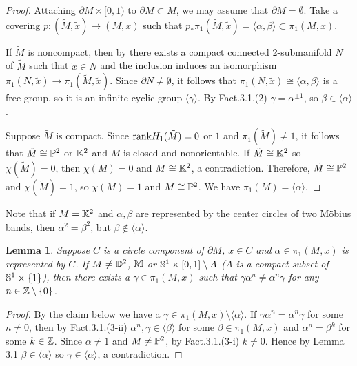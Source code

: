 \documentclass[11pt]{amsart}
\newtheorem{lemma}{Lemma}[section]
\theoremstyle{definition}
\newtheorem*{Proof of Theorem 3.1}{Proof of Theorem 3.1}
\newtheorem*{Proof of Corollary 3.1}{Proof of Corollary 3.1}
\newtheorem*{Proof of Proposition 4.1.(1)}{Proof of Proposition 4.1.(1)}
\newtheorem*{Proof of Proposition 4.1.(2)}{Proof of Proposition 4.1.(2)}
\newtheorem*{Proof of Corollary 1.1}{Proof of Corollary 1.1}
\begin{document}
\begin{proof}
Attaching $\partial M \times [0, 1)$ to $\partial M \subset M$, we may assume that $\partial M = \emptyset$. Take a covering $p : (\tilde{M}, \tilde{x}) \to (M, x)$ such that $p_{\ast}\pi_1(\tilde{M}, \tilde{x}) = \langle \alpha, \beta \rangle \subset \pi_1(M, x)$. 

If $\tilde{M}$ is noncompact, then by \cite[Lemma 2.2]{Ep} there exists a compact connected 2-submanifold $N$ of $\tilde{M}$ such that $\tilde{x} \in N$ and the inclusion induces an isomorphism $\pi_1(N, \tilde{x}) \to \pi_1(\tilde{M}, \tilde{x})$. Since $\partial N \neq \emptyset$, it follows that $\pi_1(N, \tilde{x}) \cong \langle \alpha, \beta \rangle$ is a free group, so it is an infinite cyclic group $\langle \gamma \rangle$. By Fact.3.1.(2) $\gamma = \alpha^{\pm 1}$, so $\beta \in \langle \alpha \rangle$.

Suppose $\tilde{M}$ is compact. Since ${\rm rank}H_1(\tilde{M}) = 0$ or $1$ and $\pi_1(\tilde{M}) \neq 1$, it follows that $\tilde{M} \cong {\Bbb P}^2$ or ${\Bbb K}^2$ and $M$ is closed and nonorientable. If $\tilde{M} \cong {\Bbb K}^2$ so $\chi(\tilde{M}) = 0$, then $\chi(M) = 0$ and $M \cong {\Bbb K}^2$, a contradiction. Therefore, $\tilde{M} \cong {\Bbb P}^2$ and $\chi(\tilde{M}) = 1$, so $\chi(M) = 1$ and $M \cong {\Bbb P}^2$. We have $\pi_1(M) = \langle \alpha \rangle$. 
\end{proof}

Note that if $M = {\Bbb K}^2$ and $\alpha, \beta$ are represented by the center circles of two M\"obius bands, then $\alpha^2 = \beta^2$, but $\beta \not\in \langle \alpha \rangle$.

\begin{lemma}
Suppose $C$ is a circle component of $\partial M$, $x \in C$ and $\alpha \in \pi_1(M, x)$ is represented by $C$. If $M \neq {\Bbb D}^2$, ${\Bbb M}$ or ${\Bbb S}^1 \times [0, 1] \setminus A$ {\rm (}$A$ is a compact subset of ${\Bbb S}^1 \times \{ 1 \}${\rm )}, then there exists a $\gamma \in \pi_1(M, x)$ such that $\gamma \alpha^n \neq \alpha^n \gamma$ for any $n \in {\Bbb Z} \setminus \{ 0 \}$.
\end{lemma}

\begin{proof}
By the claim below we have a $\gamma \in \pi_1(M, x) \setminus \langle \alpha \rangle$. If $\gamma \alpha^n = \alpha^n \gamma$ for some $n \neq 0$, then by Fact.3.1.(3-ii) $\alpha^n, \gamma \in \langle \beta \rangle$ for some $\beta \in \pi_1(M, x)$ and $\alpha^n = \beta^k$ for some $k \in {\Bbb Z}$. Since $\alpha \neq 1$ and $M \neq {\Bbb P}^2$, by Fact.3.1.(3-i) $k \neq 0$. Hence by Lemma 3.1 $\beta \in \langle \alpha \rangle$ so $\gamma \in \langle \alpha \rangle$, a contradiction. 
\end{proof}
\end{document}

